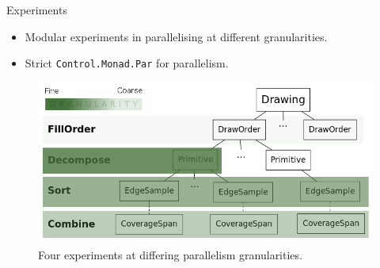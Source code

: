 \documentclass[slidestop,compress,mathserif, xcolor=table]{beamer}
\begin{document}
\begin{frame}[c]{Experiments}
\begin{itemize}
\item Modular experiments in parallelising at different granularities.
\item Strict \texttt{Control.Monad.Par} for parallelism.
\end{itemize}
\begin{figure}
\centering
\includegraphics[width=0.9\linewidth]{../tree}
\caption{Four experiments at differing parallelism granularities.}
\end{figure}
\end{frame}
\end{document}
